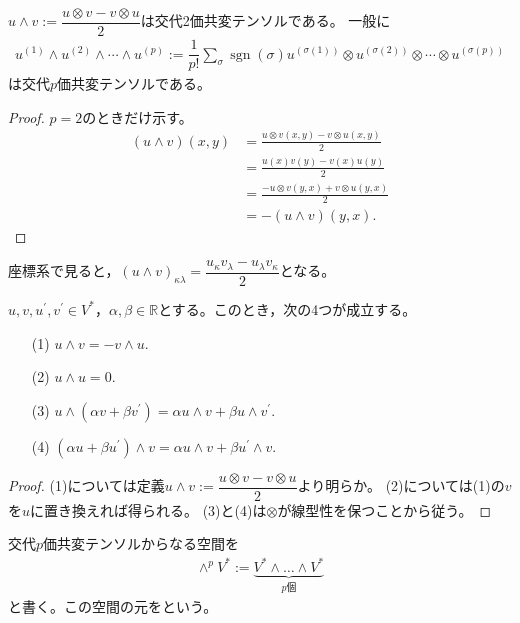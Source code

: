 \documentclass[uplatex]{jsarticle}
\DeclareMathOperator{\sgn}{sgn}
\begin{document}
\begin{hodai}
  $u \wedge v := \dfrac{u \otimes v - v \otimes u}{2}$は交代2価共変テンソルである。
  一般に
  \begin{align}
    u^{(1)} \wedge u^{(2)} \wedge \cdots \wedge u^{(p)}:=\dfrac{1}{p!} \sum_{\sigma} \sgn (\sigma) u^{(\sigma(1))} \otimes u^{(\sigma(2))} \otimes \cdots \otimes u^{(\sigma(p))}
  \end{align}
  は交代$p$価共変テンソルである。
\end{hodai}
\begin{proof}
  $p = 2$のときだけ示す。
  \begin{align*}
    (u \wedge v)(x,y) &= \frac{u \otimes v (x,y) - v \otimes u (x,y)}{2} \\
    &= \frac{u(x)v(y) - v(x)u(y)}{2} \\
    &= \frac{-u \otimes v (y,x) + v \otimes u (y,x)}{2} \\
    &= - (u \wedge v)(y,x).
  \end{align*}
\end{proof}

座標系で見ると，$(u \wedge v)_{\kappa\lambda} = \dfrac{u_{\kappa}v_{\lambda} - u_{\lambda}v_{\kappa}}{2}$となる。

\begin{hodai}
  $u,v,u^{\prime}, v^{\prime} \in V^{*}$，$\alpha, \beta \in \mathbb{R}$とする。このとき，次の4つが成立する。
  \begin{enumerate}
    \item[(1)] $u \wedge v = - v \wedge u$.
    \item[(2)] $u \wedge u = 0$.
    \item[(3)] $u \wedge (\alpha v + \beta v^{\prime}) = \alpha u \wedge v + \beta u \wedge v^{\prime}$.
    \item[(4)] $(\alpha u + \beta u^{\prime}) \wedge v = \alpha u \wedge v + \beta u^{\prime} \wedge v$.   
  \end{enumerate}
\end{hodai}
\begin{proof}
  (1)については定義$u \wedge v := \dfrac{u \otimes v - v \otimes u}{2}$より明らか。
  (2)については(1)の$v$を$u$に置き換えれば得られる。
  (3)と(4)は$\otimes$が線型性を保つことから従う。
\end{proof}

\begin{teigi}[外冪]
  交代$p$価共変テンソルからなる空間を
  \begin{align}
    \wedge^{p} V^{*} := \underbrace{V^{*} \wedge \dots \wedge V^{*}}_{p\text{個}}
  \end{align}
  と書く。この空間の元をという。
\end{teigi}
\end{document}
